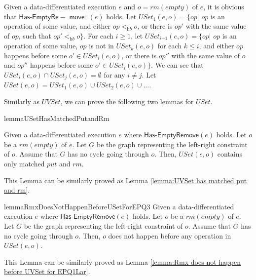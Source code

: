 Given a data-differentiated execution $e$ and $o = \textit{rm}(\textit{empty})$ of $e$, it is obvious that $\mathsf{Has\text{-}}\mathsf{EmptyRe-}$ $\mathsf{move}^{=}(e)$ holds. Let $\textit{USet}_1(e,o) = \{ \textit{op} \vert$ $\textit{op}$ is an operation of some value, and either $\textit{op} <_{\textit{hb}} o$, or there is $\textit{op}'$ with the same value of $\textit{op}$, such that $\textit{op}' <_{\textit{hb}} o \}$. For each $i \geq 1$, let $\textit{USet}_{\textit{i+1}}(e,o) = \{ \textit{op} \vert$ $\textit{op}$ is an operation of some value, $\textit{op}$ is not in $\textit{USet}_k(e,o)$ for each $k \leq i$, and either $\textit{op}$ happens before some $o' \in \textit{USet}_i(e,o)$, or there is $\textit{op}''$ with the same value of $o$ and $\textit{op}''$ happens before some $o' \in \textit{USet}_i(e,o) \}$. We can see that $\textit{USet}_i(e,o) \cap \textit{USet}_j(e,o) = \emptyset$ for any $i \neq j$. Let $\textit{USet}(e,o) = \textit{USet}_1(e,o) \cup \textit{USet}_2(e,o) \cup \ldots$.


Similarly as $\textit{UVSet}$, we can prove the following two lemmas for $\textit{USet}$.

\begin{restatable}{lemma}{USetHasMatchedPutandRm}
\label{lemma:USet has matched put and rm}

Given a data-differentiated execution $e$ where $\mathsf{Has\text{-}EmptyRemove}(e)$ holds. Let $o$ be a $\textit{rm}(\textit{empty})$ of $e$. Let $G$ be the graph representing the left-right constraint of $o$. Assume that $G$ has no cycle going through $o$. Then, $\textit{USet}(e,o)$ contains only matched $\textit{put}$ and $\textit{rm}$.
\end{restatable}

This Lemma can be similarly proved as Lemma \ref{lemma:UVSet has matched put and rm}.


\begin{restatable}{lemma}{RmxDoesNotHappenBeforeUSetForEPQ3}
\label{lemma:Rmx does not happen before USet for EPQ3}
Given a data-differentiated execution $e$ where $\mathsf{Has\text{-}EmptyRemove}(e)$ holds. Let $o$ be a $\textit{rm}(\textit{empty})$ of $e$. Let $G$ be the graph representing the left-right constraint of $o$. Assume that $G$ has no cycle going through $o$. Then, $o$ does not happen before any operation in $\textit{USet}(e,o)$.
\end{restatable}

This Lemma can be similarly proved as Lemma \ref{lemma:Rmx does not happen before UVSet for EPQ1Lar}.

